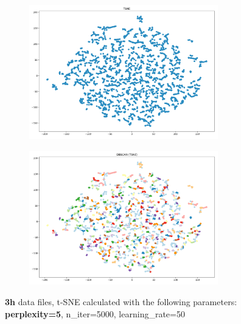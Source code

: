 \begin{figure}[H]
	\centering
	
  \centering
	\begin{subfigure}{.5\textwidth}
    \centering
    \includegraphics[width=0.9\textwidth]{./images/tsneParametersTest/perplexity/perp5-3hTSNE.png}
  \end{subfigure}%
  \begin{subfigure}{.5\textwidth}
    \centering
    \includegraphics[width=0.9\textwidth]{./images/tsneParametersTest/perplexity/perp5-3hDBSCAN.png}
	\end{subfigure}
	\caption{\textbf{3h} data files, t-SNE calculated with the following parameters: \textbf{perplexity=5}, n\_iter=5000, learning\_rate=50}
  \label{figure:3hperp5TSNE}
\end{figure}


